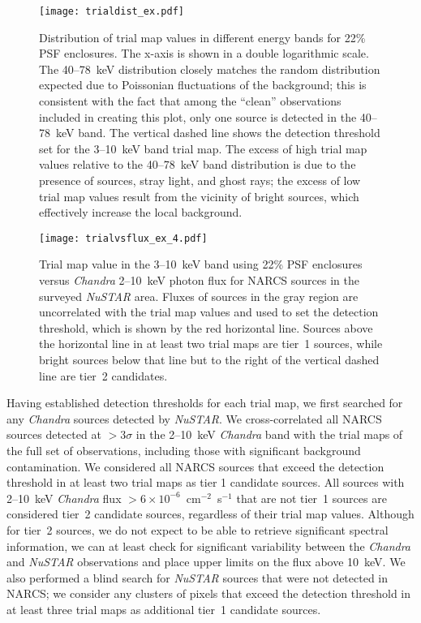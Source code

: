 \documentclass[iop,revtex4]{emulateapj}
\begin{document}
\begin{figure}
\texttt{[image: trialdist\_ex.pdf]}
\caption{Distribution of trial map values in different energy bands for 22\% PSF enclosures.  The x-axis is shown in a double logarithmic scale.  The 40--78~keV distribution closely matches the random distribution expected due to Poissonian fluctuations of the background; this is consistent with the fact that among the ``clean'' observations included in creating this plot, only one source is detected in the 40--78~keV band.  The vertical dashed line shows the detection threshold set for the 3--10~keV band trial map.  The excess of high trial map values relative to the 40--78~keV band distribution is due to the presence of sources, stray light, and ghost rays; the excess of low trial map values result from the vicinity of bright sources, which effectively increase the local background.}
\label{fig:tdist}
\end{figure}
\begin{figure}
\texttt{[image: trialvsflux\_ex\_4.pdf]}
\caption{Trial map value in the 3--10~keV band using 22\% PSF enclosures versus \textit{Chandra} 2--10~keV photon flux for NARCS sources in the surveyed \textit{NuSTAR} area.  Fluxes of sources in the gray region are uncorrelated with the trial map values and used to set the detection threshold, which is shown by the red horizontal line.  Sources above the horizontal line in at least two trial maps are tier~1 sources, while bright sources below that line but to the right of the vertical dashed line are tier~2 candidates.}
\label{fig:tflux}
\end{figure}
Having established detection thresholds for each trial map, we first searched for any \textit{Chandra} sources  detected by \textit{NuSTAR}.  We cross-correlated all NARCS sources detected at $>3\sigma$ in the 2--10~keV \textit{Chandra} band with the trial maps of the full set of observations, including those with significant background contamination.  We considered all NARCS sources that exceed the detection threshold in at least two trial maps as tier 1 candidate sources.  All sources with 2--10~keV \textit{Chandra} flux $>6\times10^{-6}$~cm$^{-2}$~s$^{-1}$ that are not tier~1 sources are considered tier~2 candidate sources, regardless of their trial map values.  Although for tier~2 sources, we do not expect to be able to retrieve significant spectral information, we can at least check for significant variability between the \textit{Chandra} and \textit{NuSTAR} observations and place upper limits on the flux above 10~keV.  We also performed a blind search for \textit{NuSTAR} sources that were not detected in NARCS; we consider any clusters of pixels that exceed the detection threshold in at least three trial maps as additional tier~1 candidate sources.  \par
\end{document}
